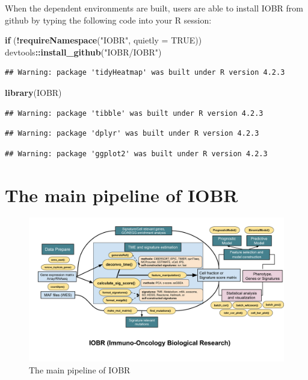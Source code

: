 \documentclass[
  12pt,
]{book}
\newenvironment{Shaded}{\begin{snugshade}}{\end{snugshade}}
\newcommand{\AttributeTok}[1]{\textcolor[rgb]{0.13,0.29,0.53}{#1}}
\newcommand{\ConstantTok}[1]{\textcolor[rgb]{0.56,0.35,0.01}{#1}}
\newcommand{\ControlFlowTok}[1]{\textcolor[rgb]{0.13,0.29,0.53}{\textbf{#1}}}
\newcommand{\FunctionTok}[1]{\textcolor[rgb]{0.13,0.29,0.53}{\textbf{#1}}}
\newcommand{\NormalTok}[1]{#1}
\newcommand{\SpecialCharTok}[1]{\textcolor[rgb]{0.81,0.36,0.00}{\textbf{#1}}}
\newcommand{\StringTok}[1]{\textcolor[rgb]{0.31,0.60,0.02}{#1}}
\theoremstyle{definition}
\theoremstyle{definition}
\theoremstyle{definition}
\theoremstyle{definition}
\theoremstyle{remark}
\begin{document}
When the dependent environments are built, users are able to install IOBR from github by typing the following code into your R session:

\begin{Shaded}
\begin{Highlighting}[]
\ControlFlowTok{if}\NormalTok{ (}\SpecialCharTok{!}\FunctionTok{requireNamespace}\NormalTok{(}\StringTok{"IOBR"}\NormalTok{, }\AttributeTok{quietly =} \ConstantTok{TRUE}\NormalTok{))  devtools}\SpecialCharTok{::}\FunctionTok{install\_github}\NormalTok{(}\StringTok{"IOBR/IOBR"}\NormalTok{)}
\end{Highlighting}
\end{Shaded}

\begin{verbatim}
## Warning: package 'tidyHeatmap' was built under R version 4.2.3
\end{verbatim}

\begin{Shaded}
\begin{Highlighting}[]
\FunctionTok{library}\NormalTok{(IOBR)}
\end{Highlighting}
\end{Shaded}

\begin{verbatim}
## Warning: package 'tibble' was built under R version 4.2.3
\end{verbatim}

\begin{verbatim}
## Warning: package 'dplyr' was built under R version 4.2.3
\end{verbatim}

\begin{verbatim}
## Warning: package 'ggplot2' was built under R version 4.2.3
\end{verbatim}

\hypertarget{the-main-pipeline-of-iobr}{%
\section{The main pipeline of IOBR}\label{the-main-pipeline-of-iobr}}

\begin{figure}

{\centering \includegraphics[width=92.42in]{./fig/IOBR-Package} 

}

\caption{The main pipeline of IOBR}\label{fig:flowchart}
\end{figure}
\end{document}
